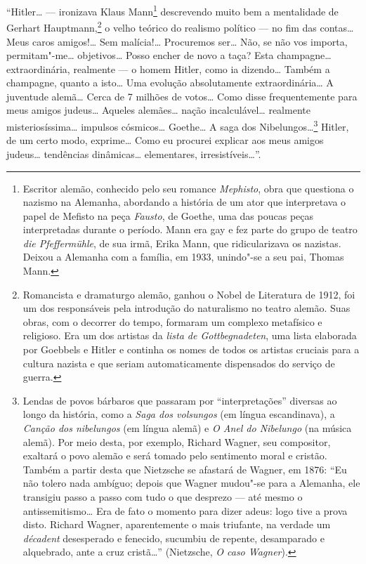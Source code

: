 ``Hitler\ldots{} --- ironizava Klaus Mann\footnote{Escritor alemão, conhecido pelo seu romance \emph{Mephisto}, obra que
  questiona o nazismo na Alemanha, abordando a história de um ator que
  interpretava o papel de Mefisto na peça \emph{Fausto}, de Goethe, uma
  das poucas peças interpretadas durante o período. Mann era gay e fez
  parte do grupo de teatro \emph{die Pfeffermühle}, de sua irmã, Erika
  Mann, que ridicularizava os nazistas. Deixou a Alemanha com a família,
  em 1933, unindo"-se a seu pai, Thomas Mann.} descrevendo muito bem a mentalidade de Gerhart
Hauptmann,\footnote{Romancista e dramaturgo alemão, ganhou o Nobel de Literatura de 1912,
  foi um dos responsáveis pela introdução do naturalismo no teatro
  alemão. Suas obras, com o decorrer do tempo, formaram um complexo
  metafísico e religioso. Era um dos artistas da \emph{lista de
  Gottbegnadeten}, uma lista elaborada por Goebbels e Hitler e continha
  os nomes de todos os artistas cruciais para a cultura nazista e que
  seriam automaticamente dispensados do serviço de guerra.} o velho teórico do realismo político --- no fim das
contas\ldots{} Meus caros amigos!\ldots{} Sem malícia!\ldots{} Procuremos ser\ldots{} Não,
se não vos importa, permitam"-me\ldots{} objetivos\ldots{} Posso encher de novo a
taça? Esta champagne\ldots{} extraordinária, realmente --- o homem Hitler,
como ia dizendo\ldots{} Também a champagne, quanto a isto\ldots{} Uma evolução
absolutamente extraordinária\ldots{} A juventude alemã\ldots{} Cerca de 7 milhões
de votos\ldots{} Como disse frequentemente para meus amigos judeus\ldots{} Aqueles
alemães\ldots{} nação incalculável\ldots{} realmente misteriosíssima\ldots{} impulsos
cósmicos\ldots{} Goethe\ldots{} A saga dos Nibelungos\ldots{}\footnote{Lendas de povos bárbaros que
  passaram por ``interpretações'' diversas ao longo da história, como a
  \emph{Saga dos volsungos} (em língua escandinava), a \emph{Canção dos
  nibelungos} (em língua alemã) e \emph{O Anel do Nibelungo} (na música
  alemã). Por meio desta, por exemplo, Richard Wagner, seu compositor,
  exaltará o povo alemão e será tomado pelo sentimento moral e cristão.
  Também a partir desta que Nietzsche se afastará de Wagner, em 1876:
  ``Eu não tolero nada ambíguo; depois que Wagner mudou"-se para a
  Alemanha, ele transigiu passo a passo com tudo o que desprezo --- até
  mesmo o antissemitismo\ldots{} Era de fato o momento para dizer adeus: logo
  tive a prova disto. Richard Wagner, aparentemente o mais triufante, na
  verdade um \emph{décadent} desesperado e fenecido, sucumbiu de
  repente, desamparado e alquebrado, ante a cruz cristã\ldots{}'' (Nietzsche,
  \emph{O caso Wagner}).} Hitler, de um certo modo, exprime\ldots{} Como eu procurei
explicar aos meus amigos judeus\ldots{} tendências dinâmicas\ldots{} elementares,
irresistíveis\ldots{}''.

